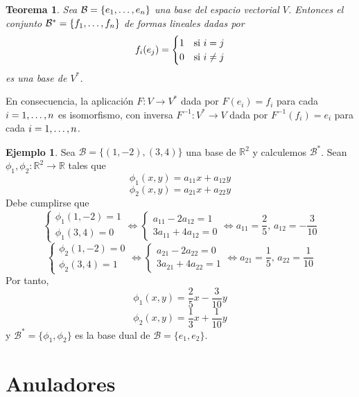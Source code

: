 \documentclass[12pt]{report}
\newtheorem{theorem}{Teorema}[chapter]
\theoremstyle{definition}
\theoremstyle{definition}
\newtheorem{example}{Ejemplo}[chapter]
\theoremstyle{remark}
\newcommand{\R}{\mathbb R}
\begin{document}
\begin{theorem}
Sea $\mathcal{B} = \{e_1,\mathellipsis,e_n\}$ una base del espacio vectorial $V$. Entonces el conjunto $\mathcal{B}^* = \{f_1,\mathellipsis,f_n\}$ de formas lineales dadas por
\[f_i(e_j) = \begin{cases}
1 & $si$ \ i = j \\
0 & $si$ \ i \neq j
\end{cases}\]
es una base de $V^*$.
\end{theorem}

En consecuencia, la aplicación $F \colon V \to V^*$ dada por $F(e_i)=f_i$ para cada $i = 1,\mathellipsis,n$ es isomorfismo, con inversa $F^{-1} \colon V^* \to V$ dada por $F^{-1}(f_i)=e_i$ para cada $i = 1,\mathellipsis,n$.

\begin{example}
    Sea $\mathcal{B} = \{(1,-2),(3,4)\}$ una base de $\R^2$ y calculemos $\mathcal{B}^*$. Sean $\phi_1,\phi_2 \colon \R^2 \to \R$ tales que
    \[\phi_1(x,y)=a_{11}x+a_{12}y\]
    \[\phi_2(x,y)=a_{21}x+a_{22}y\]
    Debe cumplirse que
    \[
    \begin{cases}
        \phi_1(1,-2)=1 \\
        \phi_1(3,4)=0
    \end{cases}
    \iff
    \begin{cases}
        a_{11}-2a_{12} = 1 \\
        3a_{11}+4a_{12}=0
    \end{cases}
    \iff
    a_{11}=\frac{2}{5}, \, a_{12}=-\frac{3}{10}
    \]
    \[
    \begin{cases}
        \phi_2(1,-2)=0 \\
        \phi_2(3,4)=1
    \end{cases}
    \iff
    \begin{cases}
        a_{21}-2a_{22} = 0 \\
        3a_{21}+4a_{22}=1
    \end{cases}
    \iff
    a_{21}=\frac{1}{5}, \, a_{22}=\frac{1}{10}
    \]
    Por tanto,
    \[\phi_1(x,y)=\frac{2}{5}x-\frac{3}{10}y\]
    \[\phi_2(x,y)=\frac{1}{3}x+\frac{1}{10}y\]
    y $\mathcal{B}^* = \{\phi_1,\phi_2\}$ es la base dual de $\mathcal{B} = \{e_1,e_2\}$.
\end{example}

\section{Anuladores}
\end{document}
